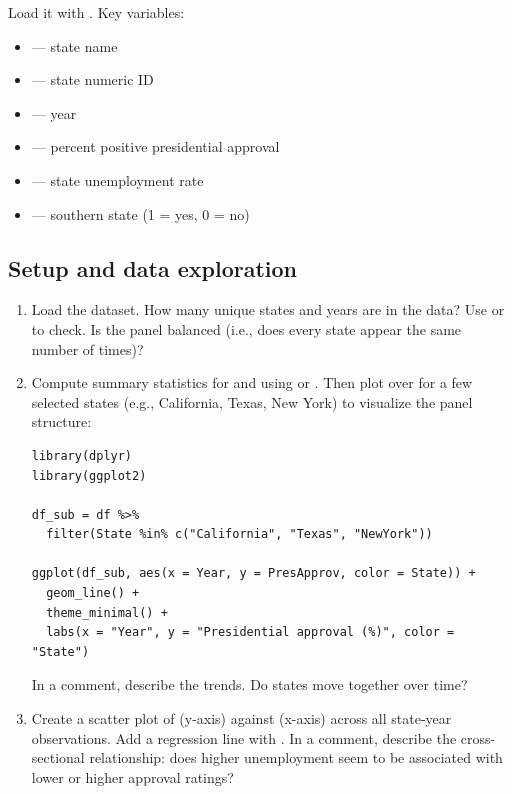Load it with . Key variables:
\begin{itemize}
  \item {} --- state name
  \item {} --- state numeric ID
  \item {} --- year
  \item {} --- percent positive presidential approval
  \item {} --- state unemployment rate
  \item {} --- southern state (1 = yes, 0 = no)
\end{itemize}

\subsection{Setup and data exploration}

\begin{enumerate}[label=\alph*)]
  \item Load the dataset. How many unique states and years are in the data? Use  or  to check. Is the panel balanced (i.e., does every state appear the same number of times)?
  \item Compute summary statistics for  and  using  or . Then plot  over  for a few selected states (e.g., California, Texas, New York) to visualize the panel structure:
  \begin{lstlisting}
library(dplyr)
library(ggplot2)

df_sub = df %>%
  filter(State %in% c("California", "Texas", "NewYork"))

ggplot(df_sub, aes(x = Year, y = PresApprov, color = State)) +
  geom_line() +
  theme_minimal() +
  labs(x = "Year", y = "Presidential approval (%)", color = "State")
  \end{lstlisting}
  In a comment, describe the trends. Do states move together over time?
  \item Create a scatter plot of  (y-axis) against  (x-axis) across all state-year observations. Add a regression line with . In a comment, describe the cross-sectional relationship: does higher unemployment seem to be associated with lower or higher approval ratings?
\end{enumerate}

